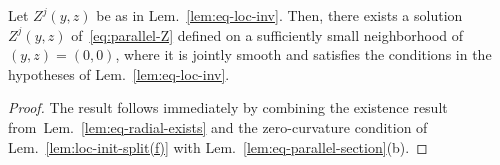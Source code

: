 \begin{lemma} \label{lem:eq-Z-exists}
Let $Z^j(y,z)$ be as in Lem.~\ref{lem:eq-loc-inv}. Then, there exists a solution
$Z^j(y,z)$ of~\eqref{eq:parallel-Z} defined on a sufficiently small neighborhood
of $(y,z) = (0,0)$, where it is jointly smooth and satisfies the conditions in
the hypotheses of Lem.~\ref{lem:eq-loc-inv}.
\end{lemma}
\begin{proof}
The result follows immediately by combining the existence result
from~Lem.~\ref{lem:eq-radial-exists} and the zero-curvature condition of
Lem.~\ref{lem:loc-init-split(f)} with Lem.~\ref{lem:eq-parallel-section}(b).
\end{proof}

